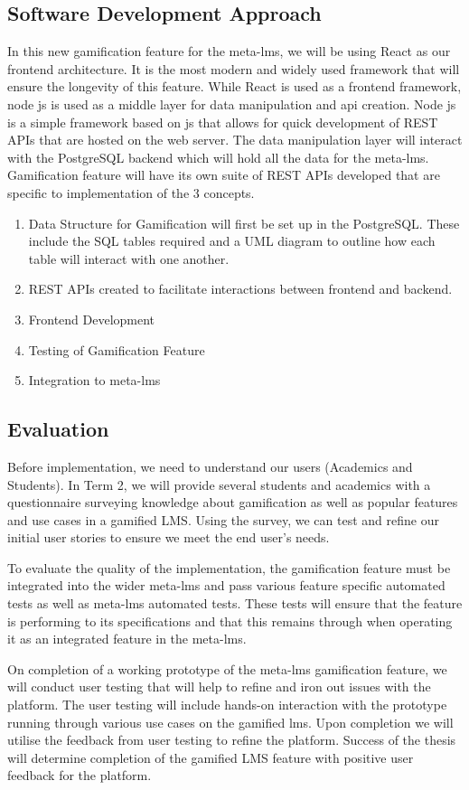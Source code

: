 \subsection{Software Development Approach}
In this new gamification feature for the meta-lms, we will be using React as our frontend architecture. It is the most modern and widely used framework that will ensure the longevity of this feature.
While React is used as a frontend framework, node js is used as a middle layer for data manipulation and api creation. Node js is a simple framework based on js that allows for quick development of REST APIs that are hosted on the web server. The data manipulation layer will interact with the PostgreSQL backend which will hold all the data for the meta-lms.
Gamification feature will have its own suite of REST APIs developed that are specific to implementation of the 3 concepts.

\begin{enumerate}
    \item Data Structure for Gamification will first be set up in the PostgreSQL. These include the SQL tables required and a UML diagram to outline how each table will interact with one another.
    \item REST APIs created to facilitate interactions between frontend and backend.
    \item Frontend Development
    \item Testing of Gamification Feature
    \item Integration to meta-lms
\end{enumerate}

\subsection{Evaluation}
Before implementation, we need to understand our users (Academics and Students). In Term 2, we will provide several students and academics with a questionnaire surveying knowledge about gamification as well as popular features and use cases in a gamified LMS. Using the survey, we can test and refine our initial user stories to ensure we meet the end user’s needs.

To evaluate the quality of the implementation, the gamification feature must be integrated into the wider meta-lms and pass various feature specific automated tests as well as meta-lms automated tests. These tests will ensure that the feature is performing to its specifications and that this remains through when operating it as an integrated feature in the meta-lms.

On completion of a working prototype of the meta-lms gamification feature, we will conduct user testing that will help to refine and iron out issues with the platform. The user testing will include hands-on interaction with the prototype running through various use cases on the gamified lms. Upon completion we will utilise the feedback from user testing to refine the platform. Success of the thesis will determine completion of the gamified LMS feature with positive user feedback for the platform.

\newpage